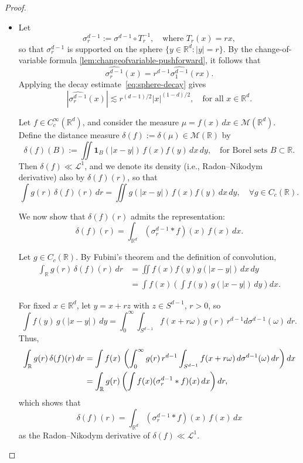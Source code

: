 \documentclass[12pt,a4paper]{report}
\theoremstyle{definition}
\begin{document}
\begin{proof}
\begin{itemize}
\item[(a)] Let
\[
\sigma_r^{d-1} := \sigma^{d-1} \circ T_r^{-1}, \quad \text{where } T_r(x) = rx,
\]
so that \( \sigma_r^{d-1} \) is supported on the sphere \( \{ y \in \mathbb{R}^d : |y| = r \} \). By the change-of-variable formula \ref{lem:changeofvariable-pushforward}, it follows that
\begin{equation} \label{eq:fourier-sphere-scaling}
\widehat{\sigma_r^{d-1}}(x) = r^{d-1} \widehat{\sigma_1^{d-1}}(r x).
\end{equation}
Applying the decay estimate~\eqref{eq:sphere-decay} gives
\begin{equation} \label{eq:sigma_r_decay}
|\widehat{\sigma_r^{d-1}}(x)| \lesssim r^{(d-1)/2} |x|^{(1 - d)/2}, \quad \text{for all } x \in \mathbb{R}^d.
\end{equation}

Let \( f \in C_c^\infty(\mathbb{R}^d) \), and consider the measure \( \mu = f(x)\, dx \in \mathcal{M}(\mathbb{R}^d) \). Define the distance measure \( \delta(f) := \delta(\mu) \in \mathcal{M}(\mathbb{R}) \) by
\[
\delta(f)(B) := \iint \mathbf{1}_B(|x - y|)\, f(x) f(y)\, dx\, dy, \quad \text{for Borel sets } B \subset \mathbb{R}.
\]
Then \( \delta(f) \ll \mathcal{L}^1 \), and we denote its density (i.e., Radon–Nikodym derivative) also by \( \delta(f)(r) \), so that
\[
\int g(r)\, \delta(f)(r)\, dr = \iint g(|x - y|)\, f(x) f(y)\, dx\, dy, \quad \forall g \in C_c(\mathbb{R}).
\]

We now show that \( \delta(f)(r) \) admits the representation:
\begin{equation} \label{eq:deltaf-convolution}
\delta(f)(r) = \int_{\mathbb{R}^d} (\sigma_r^{d-1} * f)(x)\, f(x)\, dx.
\end{equation}

Let \( g \in C_c(\mathbb{R}) \). By Fubini’s theorem and the definition of convolution,
\begin{align*}
\int_{\mathbb{R}} g(r)\, \delta(f)(r)\, dr
&= \iint f(x) f(y) g(|x - y|)\, dx\, dy \\
&= \int f(x) \left( \int f(y)\, g(|x - y|)\, dy \right) dx.
\end{align*}

For fixed \( x \in \mathbb{R}^d \), let \( y = x + rz \) with \( z \in S^{d-1} \), \( r > 0 \), so
\[
\int f(y)\, g(|x - y|)\, dy = \int_0^\infty \int_{S^{d-1}} f(x + r\omega)\, g(r)\, r^{d-1} d\sigma^{d-1}(\omega)\, dr.
\]
Thus,
\begin{align}
\int_{\mathbb{R}} g(r)\, \delta(f)(r)\, dr
&= \int f(x)\, \left( \int_0^\infty g(r)\, r^{d-1} \int_{S^{d-1}} f(x + r\omega)\, d\sigma^{d-1}(\omega) \, dr \right) dx
\\
&= \int_{\mathbb{R}} g(r) \left( \int f(x) (\sigma_r^{d-1} * f)(x)\, dx \right) dr,
\notag
\end{align}
which shows that
\[
\delta(f)(r) = \int_{\mathbb{R}^d} (\sigma_r^{d-1} * f)(x)\, f(x)\, dx
\]
as the Radon–Nikodym derivative of \( \delta(f) \ll \mathcal{L}^1 \).



\end{itemize}
\end{proof}
\end{document}

